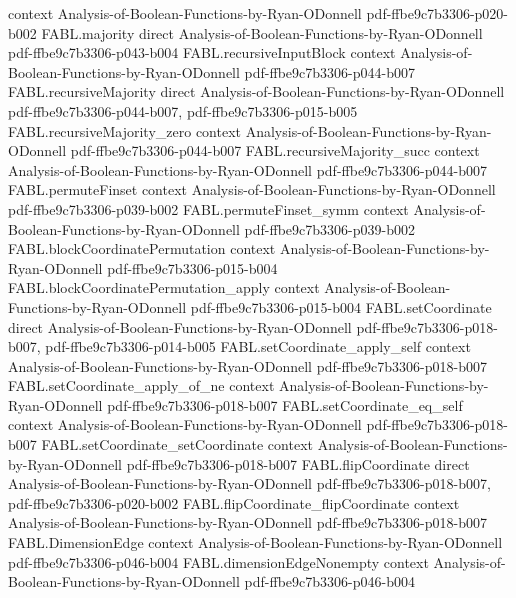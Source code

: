 \begin{theorem}
  {context}
  {Analysis-of-Boolean-Functions-by-Ryan-ODonnell}
  {pdf-ffbe9c7b3306-p020-b002}
\proofstep
  {FABL.majority}
  {direct}
  {Analysis-of-Boolean-Functions-by-Ryan-ODonnell}
  {pdf-ffbe9c7b3306-p043-b004}
\proofstep
  {FABL.recursiveInputBlock}
  {context}
  {Analysis-of-Boolean-Functions-by-Ryan-ODonnell}
  {pdf-ffbe9c7b3306-p044-b007}
\proofstep
  {FABL.recursiveMajority}
  {direct}
  {Analysis-of-Boolean-Functions-by-Ryan-ODonnell}
  {pdf-ffbe9c7b3306-p044-b007,
    pdf-ffbe9c7b3306-p015-b005}
\proofstep
  {FABL.recursiveMajority_zero}
  {context}
  {Analysis-of-Boolean-Functions-by-Ryan-ODonnell}
  {pdf-ffbe9c7b3306-p044-b007}
\proofstep
  {FABL.recursiveMajority_succ}
  {context}
  {Analysis-of-Boolean-Functions-by-Ryan-ODonnell}
  {pdf-ffbe9c7b3306-p044-b007}
\proofstep
  {FABL.permuteFinset}
  {context}
  {Analysis-of-Boolean-Functions-by-Ryan-ODonnell}
  {pdf-ffbe9c7b3306-p039-b002}
\proofstep
  {FABL.permuteFinset_symm}
  {context}
  {Analysis-of-Boolean-Functions-by-Ryan-ODonnell}
  {pdf-ffbe9c7b3306-p039-b002}
\proofstep
  {FABL.blockCoordinatePermutation}
  {context}
  {Analysis-of-Boolean-Functions-by-Ryan-ODonnell}
  {pdf-ffbe9c7b3306-p015-b004}
\proofstep
  {FABL.blockCoordinatePermutation_apply}
  {context}
  {Analysis-of-Boolean-Functions-by-Ryan-ODonnell}
  {pdf-ffbe9c7b3306-p015-b004}
\proofstep
  {FABL.setCoordinate}
  {direct}
  {Analysis-of-Boolean-Functions-by-Ryan-ODonnell}
  {pdf-ffbe9c7b3306-p018-b007,
    pdf-ffbe9c7b3306-p014-b005}
\proofstep
  {FABL.setCoordinate_apply_self}
  {context}
  {Analysis-of-Boolean-Functions-by-Ryan-ODonnell}
  {pdf-ffbe9c7b3306-p018-b007}
\proofstep
  {FABL.setCoordinate_apply_of_ne}
  {context}
  {Analysis-of-Boolean-Functions-by-Ryan-ODonnell}
  {pdf-ffbe9c7b3306-p018-b007}
\proofstep
  {FABL.setCoordinate_eq_self}
  {context}
  {Analysis-of-Boolean-Functions-by-Ryan-ODonnell}
  {pdf-ffbe9c7b3306-p018-b007}
\proofstep
  {FABL.setCoordinate_setCoordinate}
  {context}
  {Analysis-of-Boolean-Functions-by-Ryan-ODonnell}
  {pdf-ffbe9c7b3306-p018-b007}
\proofstep
  {FABL.flipCoordinate}
  {direct}
  {Analysis-of-Boolean-Functions-by-Ryan-ODonnell}
  {pdf-ffbe9c7b3306-p018-b007,
    pdf-ffbe9c7b3306-p020-b002}
\proofstep
  {FABL.flipCoordinate_flipCoordinate}
  {context}
  {Analysis-of-Boolean-Functions-by-Ryan-ODonnell}
  {pdf-ffbe9c7b3306-p018-b007}
\proofstep
  {FABL.DimensionEdge}
  {context}
  {Analysis-of-Boolean-Functions-by-Ryan-ODonnell}
  {pdf-ffbe9c7b3306-p046-b004}
\proofstep
  {FABL.dimensionEdgeNonempty}
  {context}
  {Analysis-of-Boolean-Functions-by-Ryan-ODonnell}
  {pdf-ffbe9c7b3306-p046-b004}

\end{theorem}
